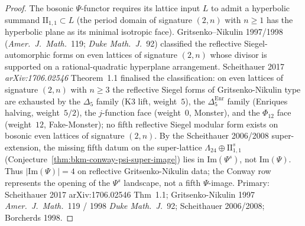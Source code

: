 \begin{proof}
The bosonic $\Psi$-functor requires its lattice input $L$ to admit
a hyperbolic summand $\mathrm{II}_{1,1}\subset L$ (the period domain
of signature $(2,n)$ with $n\ge 1$ has the hyperbolic plane as its
minimal isotropic face). Gritsenko--Nikulin 1997/1998
(\emph{Amer.\ J.\ Math.}~119; \emph{Duke Math.\ J.}~92) classified
the reflective Siegel-automorphic forms on even lattices of
signature $(2,n)$ whose divisor is supported on a rational-quadratic
hyperplane arrangement. Scheithauer 2017 \emph{arXiv:1706.02546}
Theorem~1.1 finalised the classification: on even lattices of
signature $(2,n)$ with $n\ge 3$ the reflective Siegel
forms of Gritsenko-Nikulin type are exhausted by the $\Delta_5$
family (K3 lift, weight~$5$), the $\Delta_5^{\mathrm{Enr}}$ family
(Enriques halving, weight~$5/2$), the $j$-function face
(weight~$0$, Monster), and the $\Phi_{12}$ face (weight~$12$,
Fake-Monster); no fifth reflective Siegel modular form exists on
bosonic even lattices of signature $(2,n)$. By the Scheithauer
2006/2008 super-extension, the missing fifth datum on the
super-lattice $\Lambda_{24}\oplus\mathrm{II}_{1,1}^{s}$
(Conjecture~\ref{thm:bkm-conway-psi-super-image}) lies in
$\mathrm{Im}(\Psi^{s})$, not $\mathrm{Im}(\Psi)$. Thus
$|\mathrm{Im}(\Psi)| = 4$ on reflective Gritsenko-Nikulin
data; the Conway row represents the opening of the $\Psi^{s}$
landscape, not a fifth $\Psi$-image. Primary: Scheithauer 2017
arXiv:1706.02546 Thm~1.1; Gritsenko-Nikulin 1997
\emph{Amer.\ J.\ Math.}~119 / 1998 \emph{Duke Math.\ J.}~92;
Scheithauer 2006/2008; Borcherds 1998.
\end{proof}

